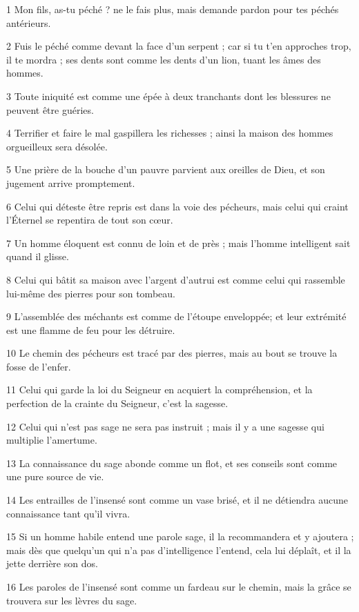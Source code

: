\par 1 Mon fils, as-tu péché ? ne le fais plus, mais demande pardon pour tes péchés antérieurs.
\par 2 Fuis le péché comme devant la face d'un serpent ; car si tu t'en approches trop, il te mordra ; ses dents sont comme les dents d'un lion, tuant les âmes des hommes.
\par 3 Toute iniquité est comme une épée à deux tranchants dont les blessures ne peuvent être guéries.
\par 4 Terrifier et faire le mal gaspillera les richesses ; ainsi la maison des hommes orgueilleux sera désolée.
\par 5 Une prière de la bouche d'un pauvre parvient aux oreilles de Dieu, et son jugement arrive promptement.
\par 6 Celui qui déteste être repris est dans la voie des pécheurs, mais celui qui craint l'Éternel se repentira de tout son cœur.
\par 7 Un homme éloquent est connu de loin et de près ; mais l'homme intelligent sait quand il glisse.
\par 8 Celui qui bâtit sa maison avec l'argent d'autrui est comme celui qui rassemble lui-même des pierres pour son tombeau.
\par 9 L'assemblée des méchants est comme de l'étoupe enveloppée; et leur extrémité est une flamme de feu pour les détruire.
\par 10 Le chemin des pécheurs est tracé par des pierres, mais au bout se trouve la fosse de l'enfer.
\par 11 Celui qui garde la loi du Seigneur en acquiert la compréhension, et la perfection de la crainte du Seigneur, c'est la sagesse.
\par 12 Celui qui n'est pas sage ne sera pas instruit ; mais il y a une sagesse qui multiplie l'amertume.
\par 13 La connaissance du sage abonde comme un flot, et ses conseils sont comme une pure source de vie.
\par 14 Les entrailles de l'insensé sont comme un vase brisé, et il ne détiendra aucune connaissance tant qu'il vivra.
\par 15 Si un homme habile entend une parole sage, il la recommandera et y ajoutera ; mais dès que quelqu'un qui n'a pas d'intelligence l'entend, cela lui déplaît, et il la jette derrière son dos.
\par 16 Les paroles de l'insensé sont comme un fardeau sur le chemin, mais la grâce se trouvera sur les lèvres du sage.
